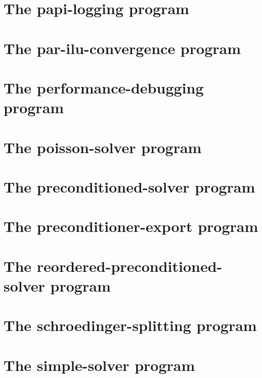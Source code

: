 \let\mypdfximage\pdfximage\def\pdfximage{\immediate\mypdfximage}\documentclass[twoside]{book}
\newcommand{\+}{\discretionary{\mbox{\scriptsize$\hookleftarrow$}}{}{}}
\begin{document}
\chapter{The papi-\/logging program}
\label{papi_logging}

\chapter{The par-\/ilu-\/convergence program}
\label{par_ilu_convergence}

\chapter{The performance-\/debugging program}
\label{performance_debugging}

\chapter{The poisson-\/solver program}
\label{poisson_solver}

\chapter{The preconditioned-\/solver program}
\label{preconditioned_solver}

\chapter{The preconditioner-\/export program}
\label{preconditioner_export}

\chapter{The reordered-\/preconditioned-\/solver program}
\label{reordered_preconditioned_solver}

\chapter{The schroedinger-\/splitting program}
\label{schroedinger_splitting}

\chapter{The simple-\/solver program}
\label{simple_solver}

\end{document}
